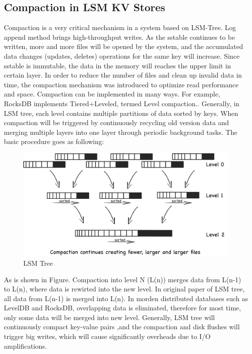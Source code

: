 \documentclass[a4paper,10pt,twoside]{article}
\begin{document}
\subsection{Compaction in LSM KV Stores}

Compaction is a very critical mechanism in a system based on LSM-Tree. 
Log append method brings high-throughput writes. 
As the sstable continues to be written, more and more files will be opened by the system, and the accumulated data changes (updates, deletes) operations for the same key will increase. 
Since sstable is immutable, the data in the memory will reaches the upper limit in certain layer.
In order to reduce the number of files and clean up invalid data in time, the compaction mechanism was introduced to optimize read performance and space.
\newline
Compaction can be implemented in many ways. For example, RocksDB implements Tiered+Leveled, termed Level compaction.\cite{RocksDB_compaction_algo1}. 
\newline
Generally, in LSM tree, each level contains multiple partitions of data sorted by keys. When  compaction will be triggered by continuously recycling old version data and merging multiple layers into one layer through periodic background tasks.
The basic procedure goes as following:
\begin{figure}[h]
    \centering
	\includegraphics[scale=0.3]{LSM_Tree1.png}
    \caption{LSM Tree}
    \label{fig:mesh1}
\end{figure}
\newline
As is shown in Figure. Compaction into level N (L(n)) merges data from L(n-1) to L(n), where data is rewirted into the new level. 
In original paper of LSM tree, all data from L(n-1) is merged into L(n). 
In morden distributed databases such as LevelDB and RocksDB, overlapping data is eliminated, therefore for most time, only some data will be merged into new level.
\newline
Generally, LSM tree will continuously compact key-value pairs ,and the compaction and disk flushes will trigger big writes, which will cause significantly overheads due to I/O amplifications.
\end{document}

